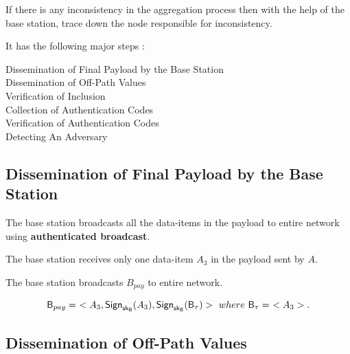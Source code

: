 \documentclass[%
  slidesonly,%
  semlayer%
  ]{seminar}                                  %
\newcommand{\sk}{\sf{sk}}
\begin{document}
\begin{slide}
    If there is any inconsistency in the aggregation process then with the help of the base station, trace down the node responsible for inconsistency.

    It has the following major steps :
    \begin{description}
      \item [Dissemination of Final Payload by the Base Station]
      \item [Dissemination of Off-Path Values]
      \item [Verification of Inclusion]
      \item [Collection of Authentication Codes]
      \item [Verification of Authentication Codes]
      \item [Detecting An Adversary]
    \end{description}

    \vfill
    \clearpage

    \subsection*{Dissemination of Final Payload by the Base Station}

      The base station broadcasts all the data-items in the payload to entire network using \textbf{authenticated broadcast}.
        
      The base station receives only one data-item $A_{3}$ in the payload sent by $A$.
      
      The base station broadcasts $B_{pay}$ to entire network.

      \begin{equation*}
        \textsf{B}_{pay} =\ <A_{3}, \textsf{Sign}_{\sk_{\textsf{B}}}(A_{3}), \textsf{Sign}_{\sk_{\textsf{B}}}(\textsf{B}_{\tau})>\ where\ \textsf{B}_{\tau} =\ <A_{3}>.
      \end{equation*}
      \vfill
      \clearpage

      \subsection*{Dissemination of Off-Path Values}
        

\end{slide}
\end{document}
